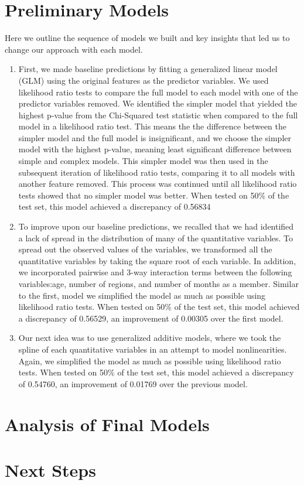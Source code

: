 \documentclass[12pt]{article}
\begin{document}
\section*{Preliminary Models}
Here we outline the sequence of models we built and key insights that led us to change our approach with each model.
\begin{enumerate}
  \item 
  First, we made baseline predictions by fitting a generalized linear model (GLM) using the original features as the predictor variables.  We used likelihood ratio tests to compare the full model to each model with one of the predictor variables removed.  We identified the simpler model that yielded the highest p-value from the Chi-Squared test statistic when compared to the full model in a likelihood ratio test.  This means the the difference between the simpler model and the full model is insignificant, and we choose the simpler model with the highest p-value, meaning least significant difference between simple and complex models.  This simpler model was then used in the subsequent iteration of likelihood ratio tests, comparing it to all models with another feature removed.  This process was continued until all likelihood ratio tests showed that no simpler model was better.  When tested on 50\% of the test set, this model achieved a discrepancy of 0.56834 
  \item
  To improve upon our baseline predictions, we recalled that we had identified a lack of spread in the distribution of many of the quantitative variables.  To spread out the observed values of the variables, we transformed all the quantitative variables by taking the square root of each variable.  In addition, we incorporated pairwise and 3-way interaction terms between the following variables:age, number of regions, and number of months as a member.  Similar to the first, model we simplified the model as much as possible using likelihood ratio tests.  When tested on 50\% of the test set, this model achieved a discrepancy of 0.56529, an improvement of 0.00305 over the first model.
  \item
  Our next idea was to use generalized additive models, where we took the spline of each quantitative variables in an attempt to model nonlinearities.  Again, we simplified the model as much as possible using likelihood ratio tests.  When tested on 50\% of the test set, this model achieved a discrepancy of 0.54760, an improvement of 0.01769 over the previous model. 
\end{enumerate}
\section*{Analysis of Final Models}
\section*{Next Steps}
\end{document}
